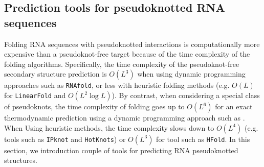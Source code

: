 \subsection{Prediction tools for pseudoknotted RNA sequences}
Folding RNA sequences with pseudoknotted interactions is  computationally more expensive than a pseudoknot-free target because of the time complexity of the folding algorithms. Specifically, the time complexity of the pseudoknot-free secondary structure prediction is $O(L^3)$ when using dynamic programming approaches such as \texttt{RNAfold},  or less with heuristic folding methods (e.g. $O(L)$ for \texttt{LinearFold} and $O(L^2\log L)$). By contrast, when considering a special class of pseudoknots, the time complexity of folding goes up to $O(L^6)$ for an exact thermodynamic prediction using a dynamic programming approach such as \cite{pseudoknotDP}. When Using heuristic methods, the time complexity slows down to $O(L^4)$ (e.g. tools such as \texttt{IPknot} and \texttt{HotKnots}) or $O(L^3)$ for tool such as \texttt{HFold}.  In this section, we introduction couple of tools for predicting RNA pseudoknotted structures.
